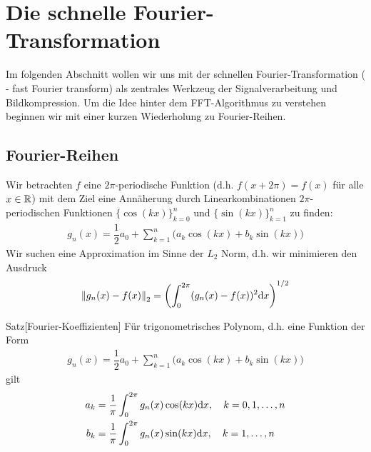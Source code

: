 
\section{Die schnelle Fourier-Transformation}

Im folgenden Abschnitt wollen wir uns mit der schnellen Fourier-Transformation ( - fast Fourier transform) 
als zentrales Werkzeug der Signalverarbeitung und Bildkompression. 
Um die Idee hinter dem FFT-Algorithmus zu verstehen beginnen wir mit einer kurzen Wiederholung zu Fourier-Reihen.

\subsection{Fourier-Reihen}
Wir betrachten $f$ eine $2\pi$-periodische Funktion (d.h. $f(x+2\pi)=f(x)$ für alle $x\in\mathbb R$) mit 
dem Ziel eine Annäherung durch Linearkombinationen $2\pi$-periodischen Funktionen $\{\cos(kx)\}_{k=0}^{n}$ und 
$\{\sin(kx)\}_{k=1}^{n}$ zu finden:
%
\begin{align*}
  g_n(x) = \dfrac{1}{2}a_0 + \sum_{k=1}^{n}\Big(a_k\cos(kx)+b_k\sin(kx)\Big)
\end{align*}
%
Wir suchen eine Approximation im Sinne der $L_2$ Norm, d.h. wir minimieren den Ausdruck
%
\begin{align*}
  \vertn{2}{g_n(x)-f(x)}_2 = \left(\int_{0}^{2\pi} (g_n(x)-f(x))^2 \diff x\right)^{1/2}
\end{align*}

\begin{colbox}{Satz}[Fourier-Koeffizienten]
  Für trigonometrisches Polynom, d.h. eine Funktion der Form  
  \begin{align*}
    g_n(x) = \dfrac{1}{2}a_0 + \sum_{k=1}^{n}\Big(a_k\cos(kx)+b_k\sin(kx)\Big)
  \end{align*}
  gilt 
  \begin{align*}
    a_k 
    &= \dfrac{1}{\pi} \int_{0}^{2\pi} g_n(x)\cos(kx) \text{d} x, \quad k=0,1,\dots,n \\
    b_k 
    &= \dfrac{1}{\pi} \int_{0}^{2\pi} g_n(x)\sin(kx) \text{d} x, \quad k=1,\dots,n 
  \end{align*}
\end{colbox}

